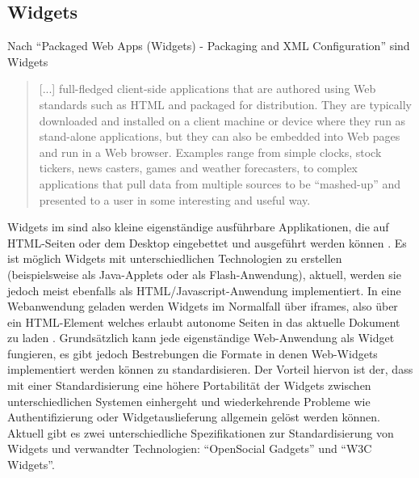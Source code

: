 \subsection{Widgets}\label{section:widgets}
Nach "`Packaged Web Apps (Widgets) - Packaging and XML Configuration"'\cite{widgets_w3c} sind Widgets
\begin{quotation}[...] full-fledged client-side applications that are authored using Web standards such as HTML and packaged for distribution. They are typically downloaded and installed on a client machine or device where they run as stand-alone applications, but they can also be embedded into Web pages and run in a Web browser. Examples range from simple clocks, stock tickers, news casters, games and weather forecasters, to complex applications that pull data from multiple sources to be "`mashed-up"' and presented to a user in some interesting and useful way.\end{quotation}
Widgets im sind also kleine eigenständige ausführbare Applikationen, die auf HTML-Seiten oder dem Desktop eingebettet und ausgeführt werden können \cite{Taraghi2010}. Es ist möglich Widgets mit unterschiedlichen Technologien zu erstellen (beispielsweise als Java-Applets oder als Flash-Anwendung), aktuell, werden sie jedoch meist ebenfalls als HTML/Javascript-Anwendung implementiert. In eine Webanwendung geladen werden Widgets im Normalfall über iframes, also über ein HTML-Element welches erlaubt autonome Seiten in das aktuelle Dokument zu laden \cite{iframe_w3c}. Grundsätzlich kann jede eigenständige Web-Anwendung als Widget fungieren, es gibt jedoch Bestrebungen die Formate in denen Web-Widgets implementiert werden können zu standardisieren. Der Vorteil hiervon ist der, dass mit einer Standardisierung eine höhere Portabilität der Widgets zwischen unterschiedlichen Systemen einhergeht und wiederkehrende Probleme wie Authentifizierung oder Widgetauslieferung allgemein gelöst werden können. Aktuell gibt es zwei unterschiedliche Spezifikationen zur Standardisierung von Widgets und verwandter Technologien: "`OpenSocial Gadgets"' und "`W3C Widgets"'.

